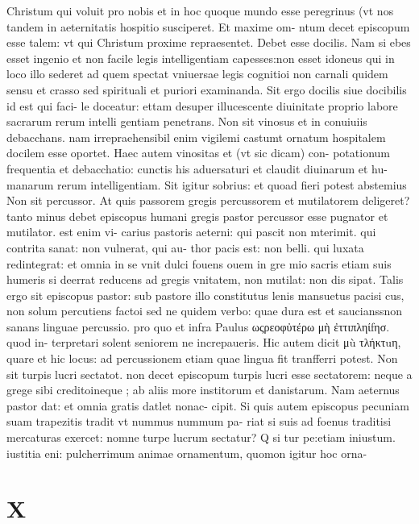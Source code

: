 \documentclass{article}
\begin{document}
\begin{pages}
Christum qui voluit pro nobis et in hoc quoque  mundo esse peregrinus (vt nos tandem in aeternitatis hospitio susciperet. Et maxime om- ntum decet episcopum esse talem: vt qui Christum proxime repraesentet. Debet esse docilis. Nam si ebes esset ingenio et non facile legis intelligentiam capesses:non esset idoneus qui in loco illo sederet ad quem spectat vniuersae legis cognitioi non carnali quidem sensu et crasso sed spirituali et puriori examinanda. Sit ergo docilis siue docibilis id est qui faci- le doceatur: ettam desuper illucescente diuinitate proprio labore sacrarum rerum intelli gentiam penetrans. Non sit vinosus et in conuiuiis debacchans. nam irrepraehensibil enim vigilemi castumt ornatum hospitalem docilem esse oportet. Haec autem vinositas et (vt sic dicam) con- potationum frequentia et debacchatio: cunctis his aduersaturi et claudit diuinarum et hu- manarum rerum intelligentiam. Sit igitur sobrius: et quoad fieri potest abstemius Non sit percussor. At quis passorem gregis percussorem et mutilatorem deligeret? tanto minus debet episcopus humani gregis pastor percussor esse pugnator et mutilator. est enim vi- carius pastoris aeterni: qui pascit non mterimit. qui contrita sanat: non vulnerat, qui au- thor pacis est: non belli. qui luxata redintegrat: et omnia in se vnit dulci fouens ouem in gre mio sacris etiam suis humeris si deerrat reducens ad gregis vnitatem, non mutilat: non dis sipat. Talis ergo sit episcopus pastor: sub pastore illo constitutus lenis mansuetus pacisi cus, non solum percutiens factoi sed ne quidem verbo: quae dura est et saucianssnon sanans linguae percussio. pro quo et infra Paulus ωςρεοφὐτέρω μὴ ἐττιπληίfησ. quod in- terpretari solent seniorem ne increpaueris. Hic autem dicit μù τλήκτuη, quare et hic locus: ad percussionem etiam quae lingua fit tranfferri potest. Non sit turpis lucri sectatot. non decet episcopum turpis lucri esse sectatorem: neque a grege sibi creditoineque ; ab aliis more institorum et danistarum. Nam aeternus pastor dat: et omnia gratis datlet nonac- cipit. Si quis autem episcopus pecuniam suam trapezitis tradit vt nummus nummum pa- riat si suis ad foenus traditisi mercaturas exercet: nomne turpe lucrum sectatur? Q si tur pe:etiam iniustum. iustitia eni: pulcherrimum animae ornamentum, quomon igitur hoc orna-  \pend
\section*{X }

\end{pages}
\end{document}
